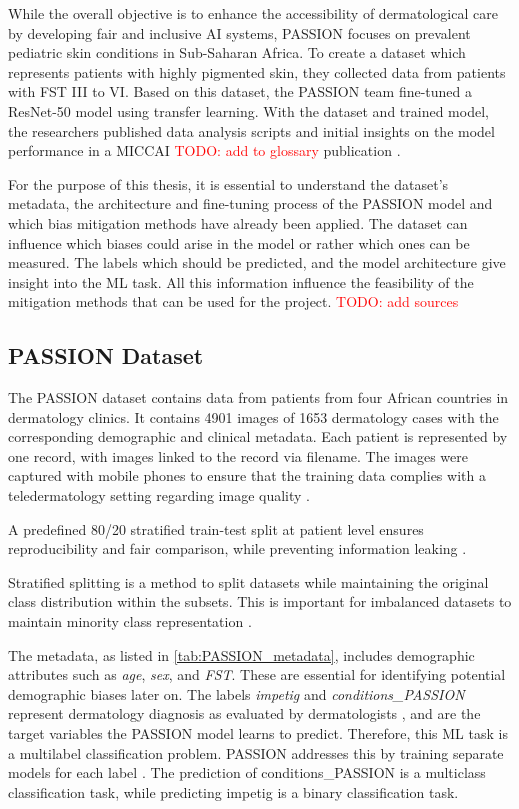 \documentclass[12pt, a4paper, oneside]{book}   	%
\renewcommand{\todo}[1]{\textcolor{red}{TODO: #1}}
\begin{document}
			While the overall objective is to enhance the accessibility of dermatological care by developing fair and inclusive AI systems, PASSION focuses on prevalent \gls{pediatric} skin conditions in Sub-Saharan Africa. To create a dataset which represents patients with highly pigmented skin, they collected data from patients with \gls{FST} III to VI. Based on this dataset, the PASSION team fine-tuned a ResNet-50 model using transfer learning. With the dataset and trained model, the researchers published data analysis scripts and initial insights on the model performance in a MICCAI \todo{add to glossary} publication \autocite{Gottfrois2024}.
			
			For the purpose of this thesis, it is essential to understand the dataset's metadata, the architecture and fine-tuning process of the PASSION model and which bias mitigation methods have already been applied. The dataset can influence which biases could arise in the model or rather which ones can be measured. The labels which should be predicted, and the model architecture give insight into the \gls{ML} task. All this information influence the feasibility of the mitigation methods that can be used for the project. \todo{add sources}
			
			\subsection{PASSION Dataset}
				The PASSION dataset contains data from patients from four African countries in dermatology clinics. It contains 4901 images of 1653 dermatology cases with the corresponding demographic and clinical metadata. Each patient is represented by one record, with images linked to the record via filename. The images were captured with mobile phones to ensure that the training data complies with a \gls{teledermatology} setting regarding image quality \autocite{Gottfrois2024}.
				
			    A predefined 80/20 stratified train-test split at patient level ensures reproducibility and fair comparison, while preventing information leaking \autocite{Gottfrois2024}.
			    
			    Stratified splitting is a method to split  datasets while maintaining the original class distribution within the subsets. This is important for imbalanced datasets to maintain minority class representation  \autocite{Balde_2023}.
			    
				The metadata, as listed in \autoref{tab:PASSION_metadata}, includes demographic attributes such as \textit{age}, \textit{sex}, and \textit{\gls{FST}}. These are essential for identifying potential demographic biases later on.	The labels \textit{impetig} and \textit{conditions\_PASSION} represent dermatology diagnosis as evaluated by dermatologists \autocite{Gottfrois2024}, and are the target variables the PASSION model learns to predict. Therefore, this \gls{ML} task is a multilabel classification problem. PASSION addresses this by training separate models for each label \autocite{Gottfrois2024}. The prediction of conditions\_PASSION is a multiclass classification task, while predicting impetig is a binary classification task. 
				
\end{document}
